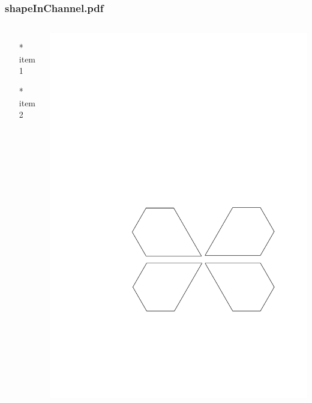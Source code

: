 \begin{frame} \frametitle{shapeInChannel.pdf}
    \begin{columns}[c]
        \begin{itemize}
            \item[*] item 1
            \item[*] item 2
        \end{itemize}
        \begin{minipage}{\linewidth}
            \begin{center}
            \includegraphics[width=.9\textwidth]{graphics/shapeInChannel.pdf}
            \label{gfx:shapeInChannel.pdf}
            \end{center}
        \end{minipage}
    \end{columns}
\end{frame}
